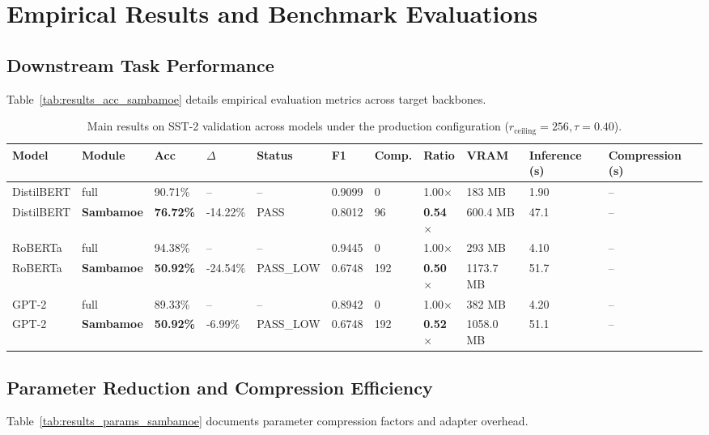 \section{Empirical Results and Benchmark Evaluations}

\subsection{Downstream Task Performance}
Table~\ref{tab:results_acc_sambamoe} details empirical evaluation metrics across target backbones.

\begin{table}[t]
\centering
\small
\begin{tabular}{lllllllllll}
\toprule
\textbf{Model} & \textbf{Module} & \textbf{Acc} & \textbf{$\Delta$} & \textbf{Status} & \textbf{F1} & \textbf{Comp.} & \textbf{Ratio} & \textbf{VRAM} & \textbf{Inference (s)} & \textbf{Compression (s)} \\
\midrule
DistilBERT & full & 90.71\% & -- & -- & 0.9099 & 0 & 1.00$\times$ & 183 MB & 1.90 & -- \\
DistilBERT & \textbf{Sambamoe} & \textbf{76.72\%} & -14.22\% & PASS & 0.8012 & 96 & \textbf{0.54$\times$} & 600.4 MB & 47.1 & -- \\
RoBERTa & full & 94.38\% & -- & -- & 0.9445 & 0 & 1.00$\times$ & 293 MB & 4.10 & -- \\
RoBERTa & \textbf{Sambamoe} & \textbf{50.92\%} & -24.54\% & PASS_LOW & 0.6748 & 192 & \textbf{0.50$\times$} & 1173.7 MB & 51.7 & -- \\
GPT-2 & full & 89.33\% & -- & -- & 0.8942 & 0 & 1.00$\times$ & 382 MB & 4.20 & -- \\
GPT-2 & \textbf{Sambamoe} & \textbf{50.92\%} & -6.99\% & PASS_LOW & 0.6748 & 192 & \textbf{0.52$\times$} & 1058.0 MB & 51.1 & -- \\
\bottomrule
\end{tabular}
\caption{Main results on SST-2 validation across models under the production configuration ($r_{\mathrm{ceiling}}=256, \tau=0.40$).}
\label{tab:main_sst2}
\end{table}

\subsection{Parameter Reduction and Compression Efficiency}
Table~\ref{tab:results_params_sambamoe} documents parameter compression factors and adapter overhead.


